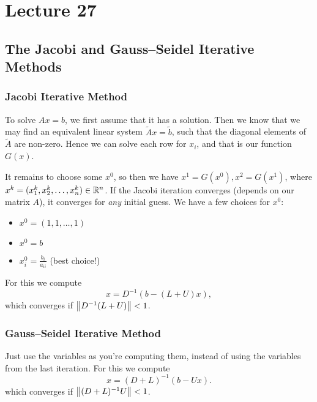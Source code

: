 \documentclass[class=article, crop=false]{standalone}
\begin{document}
  \section{Lecture 27}
  \subsection{The Jacobi and Gauss--Seidel Iterative Methods}
  \subsubsection{Jacobi Iterative Method}
  To solve $Ax = b$, we first assume that it has a solution. Then we know that we may find an equivalent linear system $\tilde Ax = \tilde b$, such that the diagonal elements of $\tilde A$ are non-zero. Hence we can solve each row for $x_i$, and that is our function $G(x)$. \par
  It remains to choose some $x^0$, so then we have $x^1 = G(x^0), x^2 = G(x^1)$, where $x^k = (x_1^k, x_2^k,\dotsc,x_n^k)\in\mathbb{R}^n$. If the Jacobi iteration converges (depends on our matrix $A$), it converges for \emph{any} initial guess. We have a few choices for $x^0$:
  \begin{itemize}
    \item $x^0 = (1, 1,\dotsc,1)$
    \item $x^0 = b$
    \item $x_i^0 = \frac{b_i}{a_{ii}}$ (best choice!)
  \end{itemize}
  For this we compute
  \[
    x = D^{-1}(b - (L + U)x),
  \]
  which converges if $\left\lVert D^{-1}(L + U)\right\rVert < 1$.
  \subsubsection{Gauss--Seidel Iterative Method}
  Just use the variables as you're computing them, instead of using the variables from the last iteration. For this we compute
  \[
    x = (D + L)^{-1}(b - Ux).
  \]
  which converges if $\left\lVert (D + L)^{-1}U\right\rVert < 1$.
\end{document}
